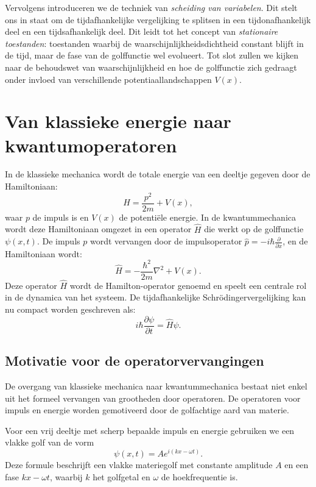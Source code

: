 \documentclass{report} %
\begin{document}
    Vervolgens introduceren we de techniek van \textit{scheiding van variabelen}.
    Dit stelt ons in staat om de tijdafhankelijke vergelijking te splitsen in een tijdonafhankelijk deel en een tijdsafhankelijk deel.
    Dit leidt tot het concept van \textit{stationaire toestanden}: toestanden waarbij de waarschijnlijkheidsdichtheid constant blijft in de tijd,
    maar de fase van de golffunctie wel evolueert.
    Tot slot zullen we kijken naar de behoudswet van waarschijnlijkheid en hoe de golffunctie zich gedraagt onder invloed van verschillende potentiaallandschappen $V(x)$.


    \section{Van klassieke energie naar kwantumoperatoren}
    In de klassieke mechanica wordt de totale energie van een deeltje gegeven door de Hamiltoniaan:
    \[
        H = \frac{p^2}{2m} + V(x),
    \]
    waar $p$ de impuls is en $V(x)$ de potentiële energie. In de kwantummechanica wordt deze Hamiltoniaan omgezet in een operator $\hat{H}$ die werkt op de golffunctie $\psi(x,t)$.
    De impuls $p$ wordt vervangen door de impulsoperator $\hat{p} = -i\hbar \frac{\partial}{\partial x}$, en de Hamiltoniaan wordt:
    \[
        \hat{H} = -\frac{\hbar^2}{2m} \nabla^2 + V(x).
    \]
    Deze operator $\hat{H}$ wordt de Hamilton-operator genoemd en speelt een centrale rol in de dynamica van het systeem.
    De tijdafhankelijke Schrödingervergelijking kan
    nu compact worden geschreven als:
    \[
        i\hbar \frac{\partial \psi}{\partial t} = \hat{H}\psi.
    \]

    \subsection{Motivatie voor de operatorvervangingen}

    De overgang van klassieke mechanica naar kwantummechanica bestaat niet enkel
    uit het formeel vervangen van grootheden door operatoren. De operatoren voor
    impuls en energie worden gemotiveerd door de golfachtige aard van materie.

    Voor een vrij deeltje met scherp bepaalde impuls en energie gebruiken we een
    vlakke golf van de vorm
    \[
        \psi(x,t)=Ae^{i(kx-\omega t)}.
    \]
    Deze formule beschrijft een vlakke materiegolf met constante amplitude $A$ en
    een fase $kx-\omega t$, waarbij $k$ het golfgetal en $\omega$ de hoekfrequentie is.
\end{document}
